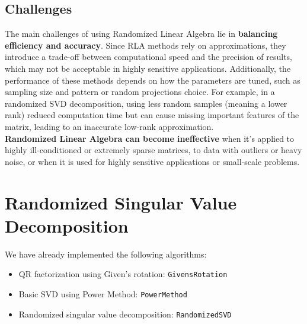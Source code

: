 \documentclass[11pt,a4paper]{article}
\begin{document}
\subsection{Challenges}
The main challenges of using Randomized Linear Algebra lie in \textbf{balancing efficiency and accuracy}. Since RLA methods rely on approximations, they introduce a trade-off between computational speed and the precision of results, which may not be acceptable in highly sensitive applications. Additionally, the performance of these methods depends on how the parameters are tuned, such as sampling size and pattern or random projections choice. For example, in a randomized SVD decomposition, using less random samples (meaning a lower rank) reduced computation time but can cause missing important features of the matrix, leading to an inaccurate low-rank approximation. \\
\textbf{Randomized Linear Algebra can become ineffective} when it's applied to highly ill-conditioned or extremely sparse matrices, to data with outliers or heavy noise, or when it is used for highly sensitive applications or small-scale problems.

\pagebreak
\section{Randomized Singular Value Decomposition}
We have already implemented the following algorithms:
\begin{itemize}
    \item QR factorization using Given's rotation: \texttt{GivensRotation}
    \item Basic SVD using Power Method: \texttt{PowerMethod}
    \item Randomized singular value decomposition: \texttt{RandomizedSVD}
\end{itemize}
\end{document}
